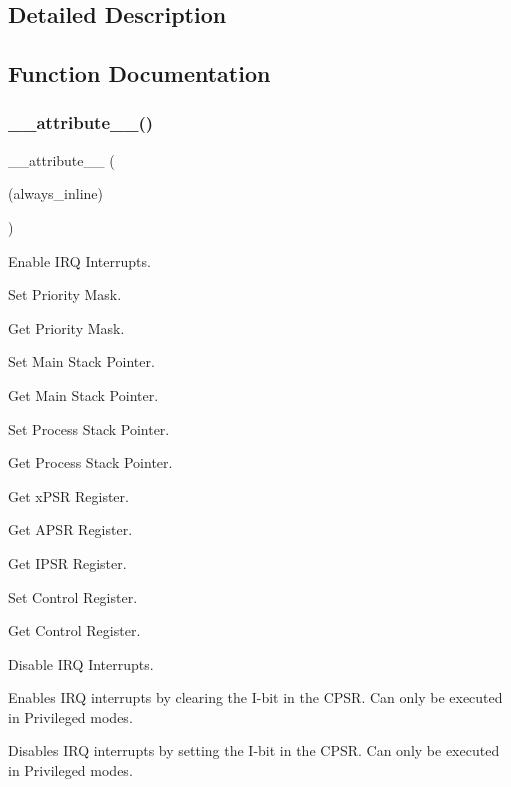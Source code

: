 \subsection{Detailed Description}


\subsection{Function Documentation}
\mbox{\label{group___c_m_s_i_s___core___reg_acc_functions_ga671b4fa3b3ab3dbc685a5473f3fc76aa}} 
\subsubsection{\texorpdfstring{\+\_\+\+\_\+attribute\+\_\+\+\_\+()}{\_\_attribute\_\_()}}
{\footnotesize\ttfamily \+\_\+\+\_\+attribute\+\_\+\+\_\+ (\begin{DoxyParamCaption}\item[{(always\+\_\+inline)}]{ }\end{DoxyParamCaption})}



Enable I\+RQ Interrupts. 

Set Priority Mask.

Get Priority Mask.

Set Main Stack Pointer.

Get Main Stack Pointer.

Set Process Stack Pointer.

Get Process Stack Pointer.

Get x\+P\+SR Register.

Get A\+P\+SR Register.

Get I\+P\+SR Register.

Set Control Register.

Get Control Register.

Disable I\+RQ Interrupts.

Enables I\+RQ interrupts by clearing the I-\/bit in the C\+P\+SR. Can only be executed in Privileged modes.

Disables I\+RQ interrupts by setting the I-\/bit in the C\+P\+SR. Can only be executed in Privileged modes.

